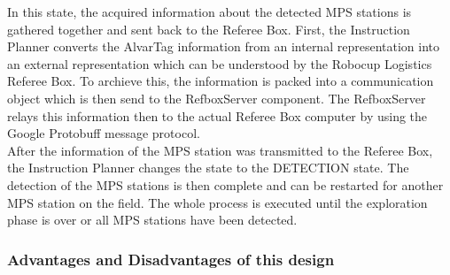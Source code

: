 \begin{itemize}
In this state, the acquired information about the detected MPS stations is gathered together and sent back to the Referee Box. First, the Instruction Planner converts the AlvarTag information from an internal representation into an external representation which can be understood by the Robocup Logistics Referee Box. To archieve this, the information is packed into a communication object which is then send to the RefboxServer component. The RefboxServer relays this information then to the actual Referee Box computer by using the Google Protobuff message protocol.  \\

After the information of the MPS station was transmitted to the Referee Box, the Instruction Planner changes the state to the DETECTION state. The detection of the MPS stations is then complete and can be restarted for another MPS station on the field. The whole process is executed until the exploration phase is over or all MPS stations have been detected. 


\end{itemize}


\subsubsection{Advantages and Disadvantages of this design} 


